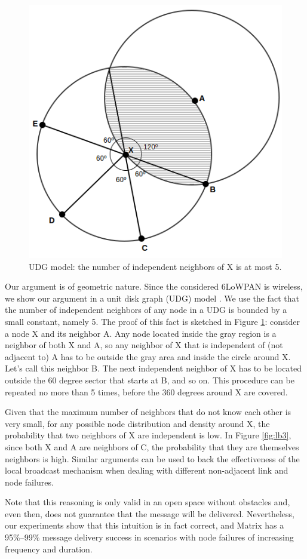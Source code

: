 \begin{figure}[!ht]
    \centering
    \includegraphics[width=.6\linewidth]{./Images/localBroadcast.png}
\caption{UDG model: the number of independent neighbors of X is at most 5.}
    \label{fig:udgIndN}
\end{figure}

Our argument is of geometric nature. Since the considered 6LoWPAN is
wireless, we show our argument in a unit disk graph (UDG) model
\cite{Clark:1991}. We use the fact that the number of independent neighbors of
any node in a UDG is bounded by a small constant, namely 5. The proof of this
fact is sketched in Figure \ref{fig:udgIndN}: consider a node X and its neighbor
A. Any node located inside the gray region is a neighbor of both X and A, so any
neighbor of X that is independent of (not adjacent to) A has to be outside the
gray area and inside the circle around X. Let's call this neighbor B. The next
independent neighbor of X has to be located outside the 60 degree sector that
starts at B, and so on. This procedure can be repeated no more than 5 times,
before the 360 degrees around X are covered.

Given that the maximum number of neighbors that do not know each
other is very small, for any possible node distribution and density
around X, the probability that two neighbors of X are independent is
low. In Figure \ref{fig:lb3}, since both X and A are neighbors of C,
the probability that they are themselves neighbors is high. Similar
arguments can be used to back the effectiveness of the local
broadcast mechanism when dealing with different non-adjacent link
and node failures.

Note that this reasoning is only valid in an open space without obstacles and,
even then, does not guarantee that the message will be delivered. Nevertheless,
our experiments show that this intuition is in fact correct, and Matrix has a
95\%--99\% message delivery success in scenarios with node failures of
increasing frequency and duration.

